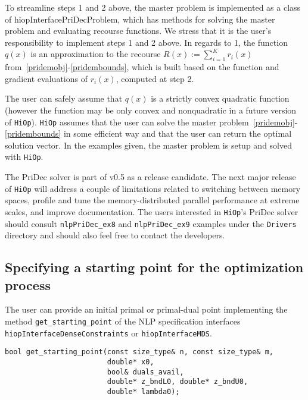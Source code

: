\documentclass[11pt]{article}
\newcounter{line}
\newcommand{\Hi}{\texttt{HiOp}\xspace}
\begin{document}
To streamline steps 1 and 2 above, the master problem is implemented as a class of hiopInterfacePriDecProblem, which has methods for solving the master problem and evaluating recourse functions. We stress that it is the user's responsibility to implement steps 1 and 2 above. In regards to 1, the function  $q(x)$ is an approximation to the recourse $R(x):=\sum_{i=1}^K r_i(x)$ from~\eqref{pridemobj}-\eqref{pridembounds}, which is built based on the function and gradient evaluations of $r_i(x)$, computed at step 2.  

The user can safely assume that $q(x)$ is a strictly  convex quadratic function (however the function may be only convex and nonquadratic in a future version of \Hi). \Hi assumes that the user can solve the master problem~\eqref{pridemobj}-\eqref{pridembounds} in some efficient way and that the user can return the optimal solution vector. In the examples given, the master problem is setup and solved with \Hi.

\bigskip

The PriDec solver is part of v0.5 as a release candidate. The next major release of \Hi will address a couple of limitations related to switching between memory spaces, profile and tune the memory-distributed parallel performance at extreme scales, and improve documentation. The users interested in \Hi's PriDec solver should consult \texttt{nlpPriDec\_ex8} and \texttt{nlpPriDec\_ex9} examples under the \texttt{Drivers} directory and should also feel free to contact the developers.

%
%

\subsection{Specifying a starting point for the optimization process}

The user  can  provide an initial primal or primal-dual point implementing the method \texttt{get\_starting\_point} of the NLP specification interfaces \texttt{hiopInterfaceDenseConstraints} or \texttt{hiopInterfaceMDS}. 

\begin{lstlisting} 
bool get_starting_point(const size_type& n, const size_type& m,
                        double* x0,
                        bool& duals_avail,
                        double* z_bndL0, double* z_bndU0,
                        double* lambda0);
\end{lstlisting} 
\end{document}
